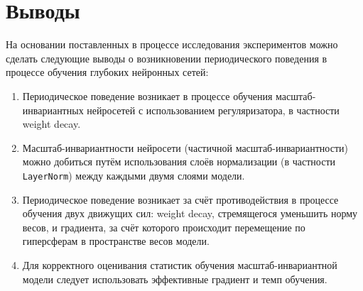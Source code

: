 \documentclass{article}
\begin{document}
\section{Выводы}
На основании поставленных в процессе исследования экспериментов можно сделать следующие выводы о возникновении периодического поведения в процессе обучения глубоких нейронных сетей:
\begin{enumerate}
    \item Периодическое поведение возникает в процессе обучения масштаб-инвариантных нейросетей с использованием регуляризатора, в частности weight decay.
    \item Масштаб-инвариантности нейросети (частичной масштаб-инвариантности) можно добиться путём использования слоёв нормализации (в частности \verb|LayerNorm|) между каждыми двумя слоями модели.
    \item Периодическое поведение возникает за счёт противодействия в процессе обучения двух движущих сил:
    weight decay, стремящегося уменьшить норму весов, и градиента, за счёт которого происходит перемещение по гиперсферам в пространстве весов модели.
    \item Для корректного оценивания статистик обучения масштаб-инвариантной модели следует использовать эффективные градиент и темп обучения.
\end{enumerate}



\end{document}

